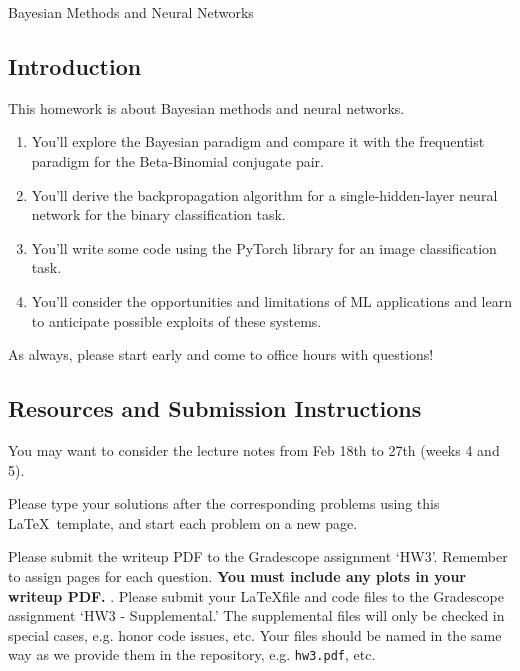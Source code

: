 \documentclass[submit]{../harvardml}
\begin{document}
\begin{center}
  {\Large Bayesian Methods and Neural Networks}\\
\end{center}

\subsection*{Introduction}

This homework is about Bayesian methods and neural networks.

\begin{enumerate}
  \item You'll explore the Bayesian paradigm and compare it with the frequentist paradigm for the Beta-Binomial conjugate pair.
  \item You'll derive the backpropagation algorithm for a single-hidden-layer neural network for the binary classification task.
  \item You'll write some code using the PyTorch library for an image classification task.
  \item You'll consider the opportunities and limitations of ML applications and learn to anticipate possible exploits of these systems.
\end{enumerate}

As always, please start early and come to office hours with questions!

\subsection*{Resources and Submission Instructions}
You may want to consider the lecture notes from Feb 18th to 27th (weeks 4 and 5).

Please type your solutions after the corresponding problems using this \LaTeX\ template, and start each problem on a new page.

Please submit the writeup PDF to the Gradescope assignment `HW3'. Remember to assign pages for each question.  \textbf{You must include any plots in your writeup PDF. }. Please submit your \LaTeX file and code files to the Gradescope assignment `HW3 - Supplemental.' The supplemental files will only be checked in special cases, e.g. honor code issues, etc. Your files should be named in the same way as we provide them in the repository, e.g. \texttt{hw3.pdf}, etc.


\newpage

\end{document}
